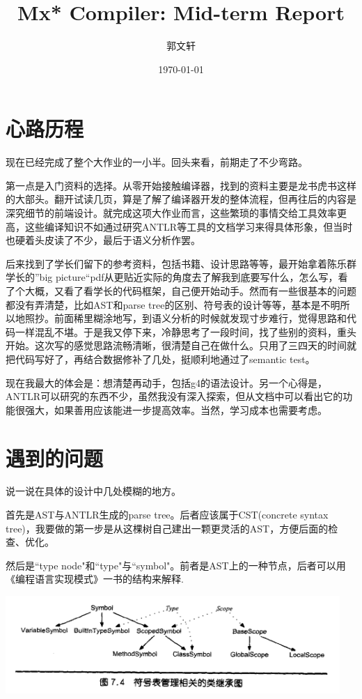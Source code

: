 \documentclass[a4paper]{article}
\title{Mx* Compiler: Mid-term Report}
\author{郭文轩}
\date{\today}
\begin{document}
\maketitle

\section{心路历程}
现在已经完成了整个大作业的一小半。回头来看，前期走了不少弯路。

第一点是入门资料的选择。从零开始接触编译器，找到的资料主要是龙书虎书这样的大部头。翻开试读几页，算是了解了编译器开发的整体流程，但再往后的内容是深究细节的前端设计。就完成这项大作业而言，这些繁琐的事情交给工具效率更高，这些编译知识不如通过研究ANTLR等工具的文档学习来得具体形象，但当时也硬着头皮读了不少，最后于语义分析作罢。

后来找到了学长们留下的参考资料，包括书籍、设计思路等等，最开始拿着陈乐群学长的”big picture“pdf从更贴近实际的角度去了解我到底要写什么，怎么写，看了个大概，又看了看学长的代码框架，自己便开始动手。然而有一些很基本的问题都没有弄清楚，比如AST和parse tree的区别、符号表的设计等等，基本是不明所以地照抄。前面稀里糊涂地写，到语义分析的时候就发现寸步难行，觉得思路和代码一样混乱不堪。于是我又停下来，冷静思考了一段时间，找了些别的资料，重头开始。这次写的感觉思路流畅清晰，很清楚自己在做什么。只用了三四天的时间就把代码写好了，再结合数据修补了几处，挺顺利地通过了semantic test。

现在我最大的体会是：想清楚再动手，包括g4的语法设计。另一个心得是，ANTLR可以研究的东西不少，虽然我没有深入探索，但从文档中可以看出它的功能很强大，如果善用应该能进一步提高效率。当然，学习成本也需要考虑。

\section{遇到的问题}
说一说在具体的设计中几处模糊的地方。

首先是AST与ANTLR生成的parse tree。后者应该属于CST(concrete syntax tree)，我要做的第一步是从这棵树自己建出一颗更灵活的AST，方便后面的检查、优化。

然后是``type node"和``type"与``symbol"。前者是AST上的一种节点，后者可以用《编程语言实现模式》一书的结构来解释.

\includegraphics[width=5in]{symbol.png}
\end{document}
